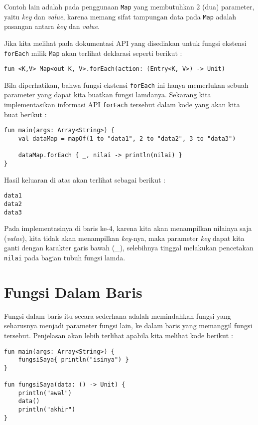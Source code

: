 Contoh lain adalah pada penggunaan \texttt{Map} yang membutuhkan 2 (dua) parameter, yaitu \textit{key} dan \textit{value}, karena memang sifat tampungan data pada \texttt{Map} adalah pasangan antara \textit{key} dan \textit{value}.

Jika kita melihat pada dokumentasi API yang disediakan untuk fungsi ekstensi \texttt{forEach} milik \texttt{Map} akan terlihat deklarasi seperti berikut :

\begin{lstlisting}
fun <K,V> Map<out K, V>.forEach(action: (Entry<K, V>) -> Unit)
\end{lstlisting}

Bila diperhatikan, bahwa fungsi ekstensi \texttt{forEach} ini hanya memerlukan sebuah parameter yang dapat kita buatkan fungsi lamdanya. Sekarang kita implementasikan informasi API \texttt{forEach} tersebut dalam kode yang akan kita buat berikut :

\begin{lstlisting}
fun main(args: Array<String>) {
	val dataMap = mapOf(1 to "data1", 2 to "data2", 3 to "data3")
	
	dataMap.forEach { _, nilai -> println(nilai) }
}
\end{lstlisting}

Hasil keluaran di atas akan terlihat sebagai berikut :

\begin{lstlisting}
data1
data2
data3
\end{lstlisting}

Pada implementasinya di baris ke-4, karena kita akan menampilkan nilainya saja (\textit{value}), kita tidak akan menampilkan \textit{key}-nya, maka parameter \textit{key} dapat kita ganti dengan karakter garis bawah (\textit{\_}), selebihnya tinggal melakukan pencetakan \texttt{nilai} pada bagian tubuh fungsi lamda.

\section{Fungsi Dalam Baris}

Fungsi dalam baris itu secara sederhana adalah memindahkan fungsi yang seharusnya menjadi parameter fungsi lain, ke dalam baris yang memanggil fungsi tersebut. Penjelasan akan lebih terlihat apabila kita melihat kode berikut :

\begin{lstlisting}
fun main(args: Array<String>) {
	fungsiSaya{ println("isinya") }
}

fun fungsiSaya(data: () -> Unit) {
	println("awal")
	data()
	println("akhir")
}
\end{lstlisting}

